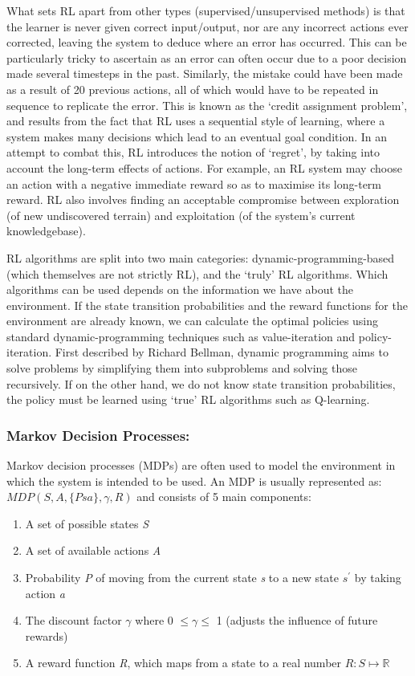 \documentclass[a4paper,oneside]{report}
\begin{document}
What sets RL apart from other types (supervised/unsupervised methods) is that the learner is never given correct input/output, nor are any incorrect actions ever corrected, leaving the system to deduce where an error has occurred. This can be particularly tricky to ascertain as an error can often occur due to a poor decision made several timesteps in the past. Similarly, the mistake could have been made as a result of 20 previous actions, all of which would have to be repeated in sequence to replicate the error. This is known as the `credit assignment problem', and results from the fact that RL uses a sequential style of learning, where a system makes many decisions which lead to an eventual goal condition. In an attempt to combat this, RL introduces the notion of `regret', by taking into account the long-term effects of actions. For example, an RL system may choose an action with a negative immediate reward so as to maximise its long-term reward. RL also involves finding an acceptable compromise between exploration (of new undiscovered terrain) and exploitation (of the system's current knowledgebase).

RL algorithms are split into two main categories: dynamic-programming-based (which themselves are not strictly RL), and the `truly' RL algorithms. Which algorithms can be used depends on the information we have about the environment. If the state transition probabilities and the reward functions for the environment are already known, we can calculate the optimal policies using standard dynamic-programming techniques such as value-iteration and policy-iteration. First described by Richard Bellman, dynamic programming aims to solve problems by simplifying them into subproblems and solving those recursively. If on the other hand, we do not know state transition probabilities, the policy must be learned using `true' RL algorithms such as Q-learning.

\subsubsection{Markov Decision Processes:}

Markov decision processes (MDPs) are often used to model the environment in which the system is intended to be used. An MDP is usually represented as: $MDP(S, A, \{Psa\}, \gamma, R)$ and consists of 5 main components: 

\begin{enumerate}
	\item A set of possible states \emph{S}
	\item A set of available actions \emph{A}
	\item Probability \emph{P} of moving from the current state \emph{s} to a new state \emph{$s^\prime$} by taking action \emph{a}
	\item The discount factor $\gamma$ where 0 $\leq \gamma \leq$ 1 (adjusts the influence of future rewards)
	\item A reward function \emph{R}, which maps from a state to a real number $R : S \mapsto \mathbb{R}$ 
\end{enumerate}
\end{document}
